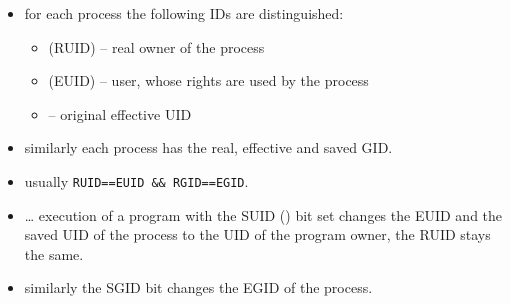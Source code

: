 \begin{slide}
\begin{itemize}
\item for each process the following IDs are distinguished:
    \begin{itemize}
    \item {} (RUID) -- real owner of the process
    \item {} (EUID) -- user, whose rights are used by the
process
    \item {} -- original effective UID
    \end{itemize}
\item similarly each process has the real, effective and saved GID.
\item usually \texttt{RUID==EUID \&\& RGID==EGID}.
\item {} \dots{} execution of a program with
the SUID () bit set changes the EUID and the saved UID of the process
to the UID of the program owner, the RUID stays the same.
\item similarly the SGID bit changes the EGID of the process. 
\end{itemize}
\end{slide}

\label{ROOT_SETUID}

